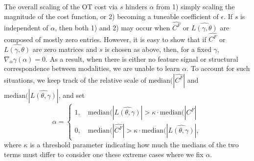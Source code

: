 \documentclass{article}
\begin{document}
The overall scaling of the OT cost via $s$  hinders $\alpha$ from 1) simply scaling the magnitude of the cost function, or 2) becoming a tuneable coefficient of $\epsilon$. If $s$ is independent of $\alpha$, then both 1) and 2) may occur when $\widehat{C^F}$ or $\widehat{L(\gamma,\theta)}$ are composed of mostly zero entries. 
However, it is easy to show that if $\widehat{C^F}$ or $\widehat{L(\gamma,\theta)}$ are zero matrices and $s$ is chosen as above, then, for a fixed $\gamma$, $\nabla_\alpha \gamma(\alpha) = 0$. As a result, when there is either no feature signal or structural correspondence between modalities, we are unable to learn $\alpha$. To account for such situations, we keep track of the relative scale of $\text{median}(|\widehat{C^F}|$ and $\text{median}(|\widehat{L(\theta, \gamma)}|$, and set
\begin{equation}
\label{eq:alpha_fixed}
    \alpha = \begin{cases}
        1, \quad \text{median}(|\widehat{L(\theta, \gamma)}| > \kappa \cdot \text{median}(|\widehat{C^F}|\\
        0,\quad \text{median}(|\widehat{C^F}| > \kappa \cdot \text{median}(|\widehat{L(\theta, \gamma)}|,
    \end{cases}
\end{equation}
where $\kappa$ is a threshold parameter indicating how much the medians of the two terms must differ to consider one these extreme cases where we fix $\alpha$.




\end{document}
